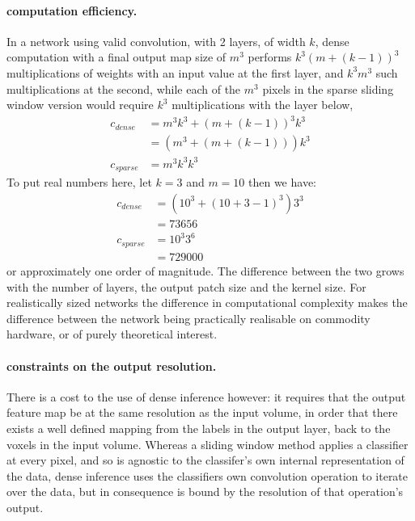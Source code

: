 \documentclass[msc]{infthesis}
\begin{document}
\paragraph*{computation efficiency.}
%
In a network using valid convolution, with 2 layers, of width \(k\), dense
computation with a final output map size of \(m^3\) performs \(k^3 (m + (k - 1))^3\)
multiplications of weights with an input value at the first layer, and \(k^3 m^3\)
such multiplications at the second, while each of the \(m^3\) pixels in the sparse
sliding window version would require \(k^3\) multiplications with the layer below, 
\begin{align}
  c_{dense}
  &=
    m^3 k^3 + (m + ( k - 1 ))^3 k^3
  \\
  &=
    (m^3 + (m + (k-1))) k^3
  \\
  c_{sparse}
  &=
  m^3 k^3 k^3 
\end{align}
To put real numbers here, let \(k = 3\) and \(m = 10\) then we have:
\begin{align}
  c_{dense}
  &=
    ( 10^3 + ( 10 + 3 - 1 )^3 ) 3^3
  \\
  &= 73656
  \\
  c_{sparse}
  &=
    10^3 3^6
  \\
  &= 729000
\end{align}
or approximately one order of magnitude. The difference between the two grows with the number of
layers, the output patch size and the kernel size.  For realistically sized networks the difference
in computational complexity makes the difference between the network being practically realisable
on commodity hardware, or of purely theoretical interest.


\paragraph*{constraints on the output resolution.}
%
There is a cost to the use of dense inference however: it requires that the output feature map
be at the same resolution as the input volume, in order that there exists a well defined mapping
from the labels in the output layer, back to the voxels in the input volume.  Whereas a sliding
window method applies a classifier at every pixel, and so is agnostic to the classifer's own
internal representation of the data, dense inference uses the classifiers own convolution
operation to iterate over the data, but in consequence is bound by the resolution of that
operation's output.
\end{document}
